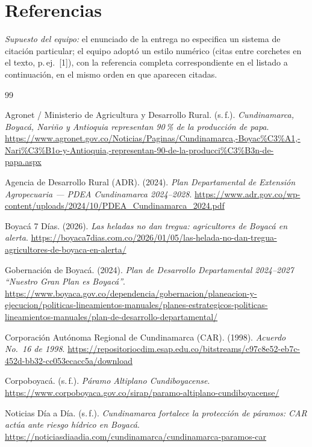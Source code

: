 \documentclass[11pt,a4paper]{article}
\newcommand{\supuesto}[1]{\textit{Supuesto del equipo: #1}}
\begin{document}
\section{Referencias}

\noindent\supuesto{} el enunciado de la entrega no especifica un sistema de citación particular; el equipo adoptó un estilo numérico (citas entre corchetes en el texto, p.\,ej.\ [1]), con la referencia completa correspondiente en el listado a continuación, en el mismo orden en que aparecen citadas.

\begin{thebibliography}{99}\setlength{\itemsep}{6pt}

 Agronet / Ministerio de Agricultura y Desarrollo Rural. (s.\,f.). \textit{Cundinamarca, Boyacá, Nariño y Antioquia representan 90\,\% de la producción de papa}. \url{https://www.agronet.gov.co/Noticias/Paginas/Cundinamarca,-Boyac%C3%A1,-Nari%C3%B1o-y-Antioquia,-representan-90-de-la-producci%C3%B3n-de-papa.aspx}

 Agencia de Desarrollo Rural (ADR). (2024). \textit{Plan Departamental de Extensión Agropecuaria --- PDEA Cundinamarca 2024--2028}. \url{https://www.adr.gov.co/wp-content/uploads/2024/10/PDEA_Cundinamarca_2024.pdf}

 Boyacá 7 Días. (2026). \textit{Las heladas no dan tregua: agricultores de Boyacá en alerta}. \url{https://boyaca7dias.com.co/2026/01/05/las-helada-no-dan-tregua-agricultores-de-boyaca-en-alerta/}

 Gobernación de Boyacá. (2024). \textit{Plan de Desarrollo Departamental 2024--2027 ``Nuestro Gran Plan es Boyacá''}. \url{https://www.boyaca.gov.co/dependencia/gobernacion/planeacion-y-ejecucion/politicas-lineamientos-manuales/planes-estrategicos-politicas-lineamientos-manuales/plan-de-desarrollo-departamental/}

 Corporación Autónoma Regional de Cundinamarca (CAR). (1998). \textit{Acuerdo No.\ 16 de 1998}. \url{https://repositoriocdim.esap.edu.co/bitstreams/c97c8e52-eb7c-452d-bb32-cc053ecacc5a/download}

 Corpoboyacá. (s.\,f.). \textit{Páramo Altiplano Cundiboyacense}. \url{https://www.corpoboyaca.gov.co/sirap/paramo-altiplano-cundiboyacense/}

 Noticias Día a Día. (s.\,f.). \textit{Cundinamarca fortalece la protección de páramos: CAR actúa ante riesgo hídrico en Boyacá}. \url{https://noticiasdiaadia.com/cundinamarca/cundinamarca-paramos-car}


\end{thebibliography}
\end{document}
